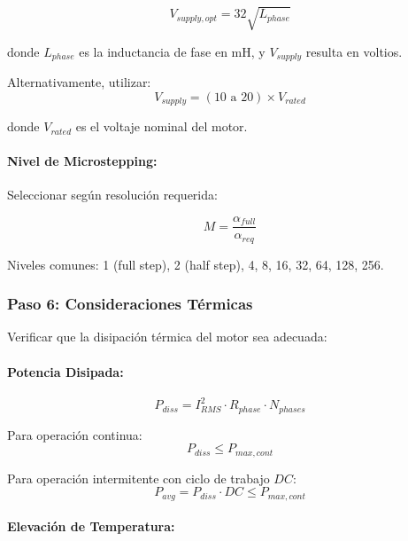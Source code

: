\begin{equation}
V_{supply,opt} = 32 \sqrt{L_{phase}}
\end{equation}

donde $L_{phase}$ es la inductancia de fase en mH, y $V_{supply}$ resulta en voltios.

Alternativamente, utilizar:
\begin{equation}
V_{supply} = (10 \text{ a } 20) \times V_{rated}
\end{equation}

donde $V_{rated}$ es el voltaje nominal del motor.

\paragraph{Nivel de Microstepping:}

Seleccionar según resolución requerida:

\begin{equation}
M = \frac{\alpha_{full}}{\alpha_{req}}
\end{equation}

Niveles comunes: 1 (full step), 2 (half step), 4, 8, 16, 32, 64, 128, 256.

\subsubsection{Paso 6: Consideraciones Térmicas}

Verificar que la disipación térmica del motor sea adecuada:

\paragraph{Potencia Disipada:}

\begin{equation}
P_{diss} = I_{RMS}^2 \cdot R_{phase} \cdot N_{phases}
\end{equation}

Para operación continua:
\begin{equation}
P_{diss} \leq P_{max,cont}
\end{equation}

Para operación intermitente con ciclo de trabajo $DC$:
\begin{equation}
P_{avg} = P_{diss} \cdot DC \leq P_{max,cont}
\end{equation}

\paragraph{Elevación de Temperatura:}

